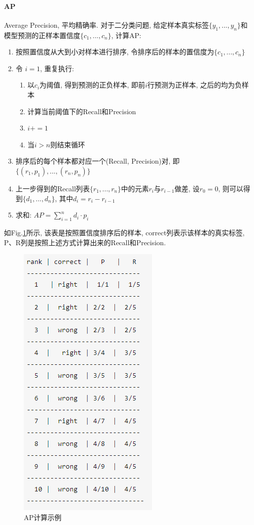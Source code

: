 \paragraph{AP}
Average Precision, 平均精确率. 对于二分类问题, 给定样本真实标签$\{y_1, ..., y_n\}$和模型预测的正样本置信度$\{c_1, ..., c_n\}$, 计算AP: 
\begin{enumerate}
	\item 按照置信度从大到小对样本进行排序, 令排序后的样本的置信度为$\{c_1, ..., c_n\}$
	\item 令 $i=1$, 重复执行: 
	\begin{enumerate}
		\item 以$c_i$为阈值, 得到预测的正负样本, 即前$i$行预测为正样本, 之后的均为负样本
		\item 计算当前阈值下的Recall和Precision
		\item $i += 1$
		\item 当$i > n$则结束循环
	\end{enumerate}
	\item 排序后的每个样本都对应一个(Recall, Precision)对, 即$\{(r_1, p_1), ..., (r_n, p_n)\}$
	\item 上一步得到的Recall列表$\{r_1, ..., r_n\}$中的元素$r_i$与$r_{i-1}$做差, 设$r_0 = 0$, 则可以得到$\{d_1, ..., d_n\}$, 其中$d_i = r_i - r_{i-1}$
	\item 求和: $AP = \sum_{i=1}^n d_i \cdot p_i$
\end{enumerate}
如Fig.\ref{fig:ap}所示, 该表是按照置信度排序后的样本, correct列表示该样本的真实标签, P、R列是按照上述方式计算出来的Recall和Precision. 
\begin{figure}[h]
	\centering
	\includegraphics[width=.3\textwidth]{pics/AP.png}
	\caption{AP计算示例}
	\label{fig:ap}
\end{figure}

